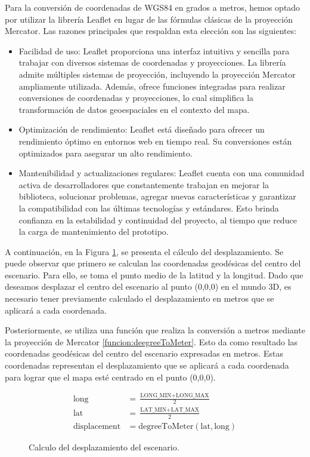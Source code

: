 \documentclass[a4paper, 11pt]{book}
\begin{document}
Para la conversión de coordenadas de WGS84 en grados a metros, hemos optado por utilizar la librería Leaflet en lugar de las fórmulas clásicas de la proyección Mercator. Las razones principales que respaldan esta elección son las siguientes:
\begin{itemize}
    \item Facilidad de uso: Leaflet proporciona una interfaz intuitiva y sencilla para trabajar con diversos sistemas de coordenadas y proyecciones. La librería admite múltiples sistemas de proyección, incluyendo la proyección Mercator ampliamente utilizada. Además, ofrece funciones integradas para realizar conversiones de coordenadas y proyecciones, lo cual simplifica la transformación de datos geoespaciales en el contexto del mapa.
    \item Optimización de rendimiento: Leaflet está diseñado para ofrecer un rendimiento óptimo en entornos web en tiempo real. Su conversiones están optimizados para asegurar un alto rendimiento.
    \item Mantenibilidad y actualizaciones regulares: Leaflet cuenta con una comunidad activa de desarrolladores que constantemente trabajan en mejorar la biblioteca, solucionar problemas, agregar nuevas características y garantizar la compatibilidad con las últimas tecnologías y estándares. Esto brinda confianza en la estabilidad y continuidad del proyecto, al tiempo que reduce la carga de mantenimiento del prototipo.
\end{itemize}
A continuación, en la Figura \ref{formula:desplazamiento}, se presenta el cálculo del desplazamiento. Se puede observar que primero se calculan las coordenadas geodésicas del centro del escenario. Para ello, se toma el punto medio de la latitud y la longitud. Dado que deseamos desplazar el centro del escenario al punto (0,0,0) en el mundo 3D, es necesario tener previamente calculado el desplazamiento en metros que se aplicará a cada coordenada.

Posteriormente, se utiliza una función que realiza la conversión a metros mediante la proyección de Mercator \ref{funcion:deegreeToMeter}. Esto da como resultado las coordenadas geodésicas del centro del escenario expresadas en metros. Estas coordenadas representan el desplazamiento que se aplicará a cada coordenada para lograr que el mapa esté centrado en el punto (0,0,0).
\begin{figure}[H]
\begin{align*}
\text{long} &= \frac{{\text{LONG\_MIN} + \text{LONG\_MAX}}}{2} \\
\text{lat} &= \frac{{\text{LAT\_MIN} + \text{LAT\_MAX}}}{2} \\
\text{displacement} &= \text{degreeToMeter}(\text{lat}, \text{long})
\end{align*}
\caption{Calculo del desplazamiento del escenario.}
  \label{formula:desplazamiento}
\end{figure}
\end{document}
